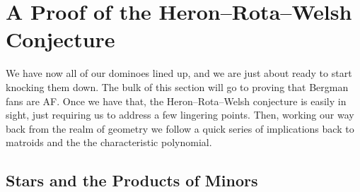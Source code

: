 \documentclass[12pt,oneside]{../../sfsuthesis}
\begin{document}
\chapter{A Proof of the Heron--Rota--Welsh Conjecture}

We have now all of our dominoes lined up, and we are just about ready to start knocking them down.
The bulk of this section will go to proving that Bergman fans are AF\@.
Once we have that, the Heron--Rota--Welsh conjecture is easily in sight, just requiring us to address a few lingering points.
Then, working our way back from the realm of geometry we follow a quick series of implications back to matroids and the the characteristic polynomial.

\section{Stars and the Products of Minors}
\end{document}
